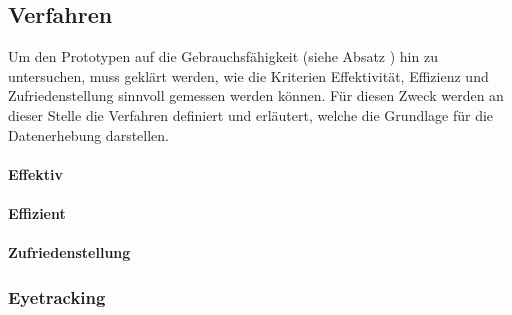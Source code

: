 \documentclass[Bachelorarbeit.tex]{subfiles}
\begin{document}
\subsection{Verfahren}
\label{Verfahren}
Um den Prototypen auf die Gebrauchsfähigkeit (siehe Absatz ) hin zu untersuchen, muss geklärt werden, wie die Kriterien Effektivität, Effizienz und Zufriedenstellung sinnvoll gemessen werden können. 
Für diesen Zweck werden an dieser Stelle die Verfahren definiert und erläutert, welche die Grundlage für die Datenerhebung darstellen.



\paragraph{Effektiv}

\paragraph{Effizient}

\paragraph{Zufriedenstellung}

\subsubsection{Eyetracking}
\label{Eyetracking}
\end{document}
